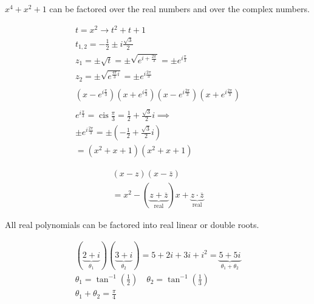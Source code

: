 \documentclass[00_complete]{subfiles}
\begin{document}
\begin{example}
\(x^4+x^2+1\) can be factored over the real numbers and over the complex
numbers.

\[
\begin{gathered}
t = x^2 \to t^2 + t + 1 \\
t_{1,2} = -\frac{1}{2} \pm i \frac{\sqrt 3}{2} \\
z_1 = \pm \sqrt{t} = \pm \sqrt{e^{i+\frac{2 \pi}{3}}} = \pm e^{i\frac{\pi}{3}} \\
z_2 = \pm \sqrt{e^{\frac{4 \pi}{3}i}} = \pm e^{i\frac{2 \pi}{3}} \\\\
(x-e^{i \frac{\pi}{3}})(x+e^{i \frac{\pi}{3}})(x-e^{i\frac{2 \pi}{3}})(x+e^{i\frac{2 \pi}{3}}) \\ \\
e^{i \frac{\pi}{3}} = \operatorname{cis} \frac{\pi}{3} = \frac{1}{2}+ \frac{\sqrt 3}{2}i \implies \\
\pm e^{i\frac{2 \pi}{3}} = \pm\left(-\frac{1}{2}+\frac{\sqrt 3}{2}i\right) \\
=(x^2+x+1)(x^2+x+1)
\end{gathered}
\]

\[
\begin{gathered}
(x-z)(x-\overline z) \\
= x^2 - (\underbrace{z + \overline z}_{\text{real}}) x + \underbrace{z \cdot
\overline z}_{\text{real}}
\end{gathered}
\]

All real polynomials can be factored into real linear or double roots.

\end{example}
\begin{example}
\[
\begin{gathered}
(\underbrace{2+i}_{\theta_1})(\underbrace{3+i}_{\theta_2}) = 5+ 2i +3i + i^2 = \underbrace{5+5i}_{\theta_1 + \theta_2} \\
\theta_1 =\tan^{-1} \left(\frac{1}{2}\right) \quad \theta_2 = \tan^{-1}
\left(\frac{1}{3}\right) \\
\theta_ 1+ \theta_2 = \frac{\pi}{4}
\end{gathered}
\]

\end{example}
\end{document}
